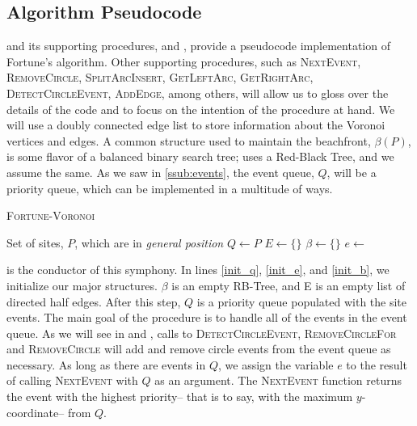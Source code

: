 \documentclass[12pt,twoside]{reedthesis}
\begin{document}
  \subsection{Algorithm Pseudocode} %
  \label{sub:sweep_algorithm_pseudocode}
     and its supporting procedures,  and , provide a pseudocode implementation of Fortune's algorithm. Other supporting procedures, such as \textsc{NextEvent, RemoveCircle, SplitArcInsert, GetLeftArc, GetRightArc, DetectCircleEvent, AddEdge}, among others, will allow us to gloss over the details of the code and to focus on the intention of the procedure at hand. We will use a doubly connected edge list to store information about the Voronoi vertices and edges. A common structure used to maintain the beachfront, $\beta(P)$, is some flavor of a balanced binary search tree; \textcite{deberg} uses a Red-Black Tree, and we assume the same. As we saw in \cref{ssub:events}, the event queue, $Q$, will be a priority queue, which can be implemented in a multitude of ways.\par
    
    \begin{algorithm}[!htb]
    \caption{\textsc{Fortune-Voronoi}}\label{fortune_vor}
    \begin{algorithmic}[1]
    \Require Set of sites, $P$, which are in \emph{general position}
    \State $Q\gets P$ \label{init_q} 
    \State $E\gets \{\}$ \label{init_e} 
    \State $\beta\gets \{\}$ \label{init_b}
     \label{vs_while}
      \State $e\gets$ 
        \State{}
      \Else
        \State{}
      \EndIf
    \EndWhile \label{vs_while_end}
    \EndProcedure
    \end{algorithmic} 
    \end{algorithm}

     is the conductor of this symphony. In lines \ref{init_q}, \ref{init_e}, and \ref{init_b}, we initialize our major structures. $\beta$ is an empty RB-Tree, and E is an empty list of directed half edges. After this step, $Q$ is a priority queue populated with the site events. The main goal of the  procedure is to handle all of the events in the event queue. As we will see in  and , calls to \textsc{DetectCircleEvent, RemoveCircleFor} and \textsc{RemoveCircle} will add and remove circle events from the event queue as necessary. As long as there are events in $Q$, we assign the variable $e$ to the result of calling \textsc{NextEvent} with $Q$ as an argument. The \textsc{NextEvent} function returns the event with the highest priority-- that is to say, with the maximum $y$-coordinate-- from $Q$.\par
\end{document}
